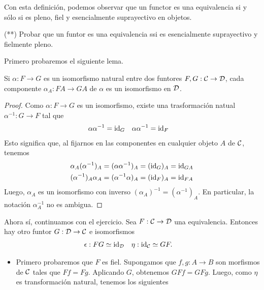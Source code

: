 Con esta definición, podemos observar que un functor es una equivalencia si y sólo si es pleno, fiel y esencialmente suprayectivo en objetos.
\begin{exe}%
    (**) Probar que un funtor es una equivalencia ssi es
      esencialmente suprayectivo y fielmente pleno.
\end{exe}
\begin{sol}
    Primero probaremos el siguiente lema.
    \begin{lemma}
        Si $\alpha:F\to G$ es un isomorfismo natural entre dos funtores
        $F,G:\cal C\to\cal D$, cada componente $\alpha_A:FA\to GA$ de
        $\alpha$ es un isomorfismo en $\cal D$.
    \end{lemma}
    \begin{proof}
        Como $\alpha:F\to G$ es un isomorfismo, existe una trasformación
        natual $\alpha^{-1}:G\to F$ tal que
        \begin{align*}
            \alpha\alpha^{-1} &= \id_G
                & \alpha\alpha^{-1} &= \id_F
        \end{align*}
        Esto significa que, al fijarnos en
        las componentes en cualquier objeto $A$ de $\cal C$, tenemos
        \begin{align*}
                \alpha_A(\alpha^{-1})_A
                = (\alpha\alpha^{-1})_A
                &= (\id_G)_A
                = \id_{GA} \\
                (\alpha^{-1})_A\alpha_A
                =(\alpha^{-1}\alpha)_A
                &= (\id_{F})_A
                = \id_{FA}
        \end{align*}
        Luego, $\alpha_A$ es un isomorfismo con inverso
        $(\alpha_A)^{-1}=(\alpha^{-1})_A$.
        En particular, la notación $\alpha^{-1}_A$ no es ambigua.
    \end{proof}
    Ahora sí, continuamos con el ejercicio.
    Sea $F:\cal C \to \cal D$ una equivalencia.
    Entonces hay otro funtor $G:\cal D\to \cal C$ e isomorfismos
    \begin{align*}
        \epsilon : FG &\simeq \id_{\cal D} & \eta : \id_{\cal C} &\simeq GF.
    \end{align*}
    \begin{itemize}
        \item 
        Primero probaremos que $F$ es fiel.
        Supongamos que $f,g:A\to B$ son morfismos de $\cal C$ tales que
        $Ff = Fg$.
        Aplicando $G$, obtenemos $GFf=GFg$.
        Luego, como $\eta$ es transformación natural, tenemos los siguientes

\end{itemize}
\end{sol}
